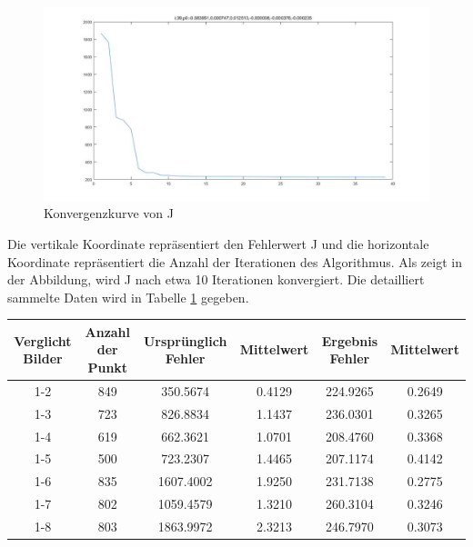 \begin{figure}[H]
 \centering 
  \includegraphics[keepaspectratio,width=1.0\textwidth]{images/6_Auswertung/J8.pdf}
 \caption{Konvergenzkurve von J}
 \label{fig:Konvergenzkurve}
\end{figure}


Die vertikale Koordinate repräsentiert den Fehlerwert J und die horizontale Koordinate repräsentiert die Anzahl der Iterationen des Algorithmus. Als zeigt in der Abbildung, wird J nach etwa 10 Iterationen konvergiert. Die detailliert sammelte Daten wird in Tabelle \ref{tbl:Daten des Fehlers} gegeben.

\begin{table}[htb]
	\label{tbl:Daten des Fehlers}
	\footnotesize
	\centering
	\begin{tabular}{|c|c|c|c|c|c|}
	\toprule
	\textbf{Verglicht Bilder} & \textbf{Anzahl der Punkt} & \textbf{Ursprünglich Fehler} & \textbf{Mittelwert} &\textbf{Ergebnis Fehler} & \textbf{Mittelwert}\\
	\midrule
	1-2 & 849 & 350.5674 & 0.4129 & 224.9265 & 0.2649\\ 
	1-3 & 723 & 826.8834 & 1.1437 & 236.0301 & 0.3265\\ 
	1-4 & 619 & 662.3621 & 1.0701 & 208.4760 & 0.3368\\ 
	1-5 & 500 & 723.2307 & 1.4465 & 207.1174 & 0.4142\\ 
	1-6 & 835 & 1607.4002 & 1.9250& 231.7138 & 0.2775\\ 
	1-7 & 802 & 1059.4579 & 1.3210& 260.3104 & 0.3246\\ 
	1-8 & 803 & 1863.9972 & 2.3213& 246.7970 & 0.3073\\ 
	\bottomrule
	\end{tabular}
\end{table} 

